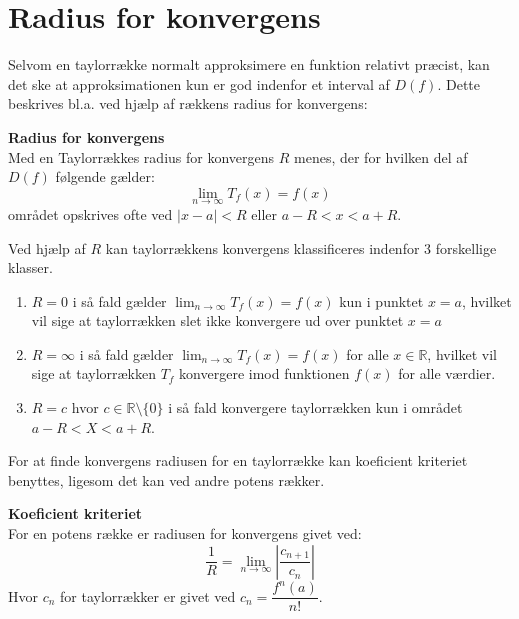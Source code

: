 \section{Radius for konvergens}
Selvom en taylorrække normalt approksimere en funktion relativt præcist, kan det ske at
approksimationen kun er god indenfor et interval af $D(f)$. Dette beskrives bl.a. ved hjælp af rækkens
radius for konvergens:
\begin{defn} %
    \textbf{Radius for konvergens}\\
    Med en Taylorrækkes radius for konvergens $R$ menes, der for hvilken del af $D(f)$ følgende gælder:
    \[
        \lim_{n \rightarrow \infty} T_f(x) = f(x)
    \]
    området opskrives ofte ved $|x-a| < R$ eller $a - R < x < a + R$.
\end{defn}
\label{def:radiusForKonvergens}
Ved hjælp af $R$ kan taylorrækkens konvergens klassificeres indenfor 3 forskellige klasser.
\begin{enumerate} %
    \item $R = 0$ i så fald gælder $\lim_{n \rightarrow \infty} T_f(x) = f(x)$ kun i punktet $x = a$,
    hvilket vil sige at taylorrækken slet ikke konvergere ud over punktet $x = a$
    \item $R = \infty$ i så fald gælder $\lim_{n \rightarrow \infty} T_f(x) = f(x)$ for alle $x \in \mathbb{R}$,
    hvilket vil sige at taylorrækken $T_f$ konvergere imod funktionen $f(x)$ for alle værdier.
    \item $R = c$ hvor $c \in \mathbb{R}\setminus\{0\}$ i så fald konvergere taylorrækken kun i området $a - R < X < a + R$.
\end{enumerate}
For at finde konvergens radiusen for en taylorrække kan koeficient kriteriet benyttes, ligesom det kan ved andre potens rækker.
\begin{defn} %
    \textbf{Koeficient kriteriet}\\For en potens række er radiusen for konvergens givet ved:
    \[
        \frac{1}{R} = \lim_{n \rightarrow \infty} \left\lvert \frac{c_{n + 1}}{c_n} \right\lvert
    \]
    Hvor $c_n$ for taylorrækker er givet ved $c_n = \dfrac{f^n(a)}{n!}$.
\end{defn} %
\label{def:koeficientKriteriet}
